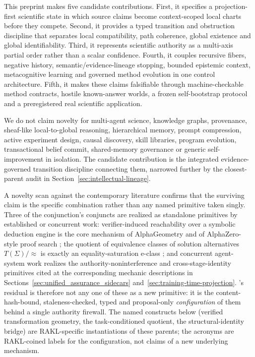 This preprint makes five candidate contributions. First, it specifies a projection-first scientific state in which source claims become context-scoped local charts before they compete. Second, it provides a typed transition and obstruction discipline that separates local compatibility, path coherence, global existence and global identifiability. Third, it represents scientific authority as a multi-axis partial order rather than a scalar confidence. Fourth, it couples recursive fibers, negative history, semantic/evidence-lineage stopping, bounded epistemic context, metacognitive learning and governed method evolution in one control architecture. Fifth, it makes these claims falsifiable through machine-checkable method contracts, hostile known-answer worlds, a frozen self-bootstrap protocol and a preregistered real scientific application.

We do not claim novelty for multi-agent science, knowledge graphs, provenance, sheaf-like local-to-global reasoning, hierarchical memory, prompt compression, active experiment design, causal discovery, skill libraries, program evolution, transactional belief commit, shared-memory governance or generic self-improvement in isolation. The candidate contribution is the integrated evidence-governed transition discipline connecting them, narrowed further by the closest-parent audit in Section~\ref{sec:intellectual-lineage}.

A novelty scan against the contemporary literature confirms that the surviving claim is the specific combination rather than any named primitive taken singly. Three of the conjunction's conjuncts are realized as standalone primitives by established or concurrent work: verifier-induced reachability over a symbolic deduction engine is the core mechanism of AlphaGeometry \cite{alphageometry2024} and of AlphaZero-style proof search \cite{htps2022}; the quotient of equivalence classes of solution alternatives $T(\Sigma)/{\approx}$ is exactly an equality-saturation e-class \cite{egg2021}; and concurrent agent-system work realizes the authority-noninterference and cross-stage-identity primitives cited at the corresponding mechanic descriptions in Sections~\ref{sec:unified_assurance_sidecars} and~\ref{sec:training-time-projection}. \RAKL{}'s residual is therefore not any one of these as a new primitive: it is the content-hash-bound, staleness-checked, typed and proposal-only \emph{configuration} of them behind a single authority firewall. The named constructs below (verified transformation geometry, the task-conditioned quotient, the structural-identity bridge) are RAKL-specific instantiations of these parents; the acronyms are RAKL-coined labels for the configuration, not claims of a new underlying mechanism.

